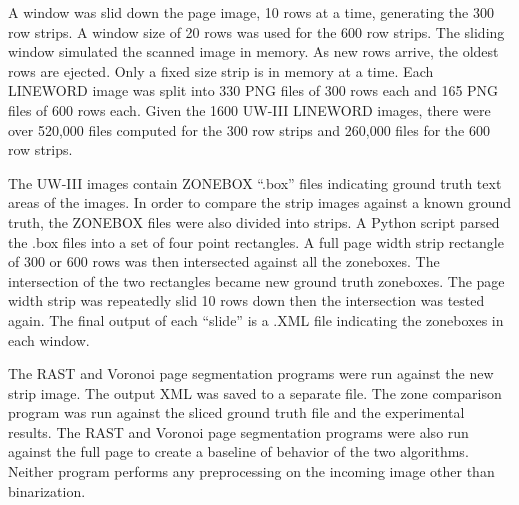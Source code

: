 \documentclass[conference]{IEEEtran}
\begin{document}
A window was slid down the page image, 10 rows at a time, generating the 300
row strips. A window size of 20 rows was used for the 600 row strips.  The
sliding window simulated the scanned image in memory. As new rows arrive, the
oldest rows are ejected. Only a fixed size strip is in memory at a time. Each
LINEWORD image was split into 330 PNG files of 300 rows each and 165 PNG files
of 600 rows each.  Given the 1600 UW-III LINEWORD images, there were over
520,000 files computed for the 300 row strips and 260,000 files for the 600 row
strips.

The UW-III images contain ZONEBOX “.box” files indicating ground truth text
areas of the images. In order to compare the strip images against a known
ground truth, the ZONEBOX files were also divided into strips. A Python script
parsed the .box files into a set of four point rectangles. A full page width
strip rectangle of 300 or 600 rows was then intersected against all the
zoneboxes. The intersection of the two rectangles became new ground truth
zoneboxes. The page width strip was repeatedly slid 10 rows down then the
intersection was tested again. The final output of each “slide” is a .XML file
indicating the zoneboxes in each window.

The RAST and Voronoi page segmentation programs were run against the new strip
image. The output XML was saved to a separate file. The zone comparison program
was run against the sliced ground truth file and the experimental results. The
RAST and Voronoi page segmentation programs were also run against the full page
to create a baseline of behavior of the two algorithms.  Neither program
performs any preprocessing on the incoming image other than binarization.


%
\end{document}
